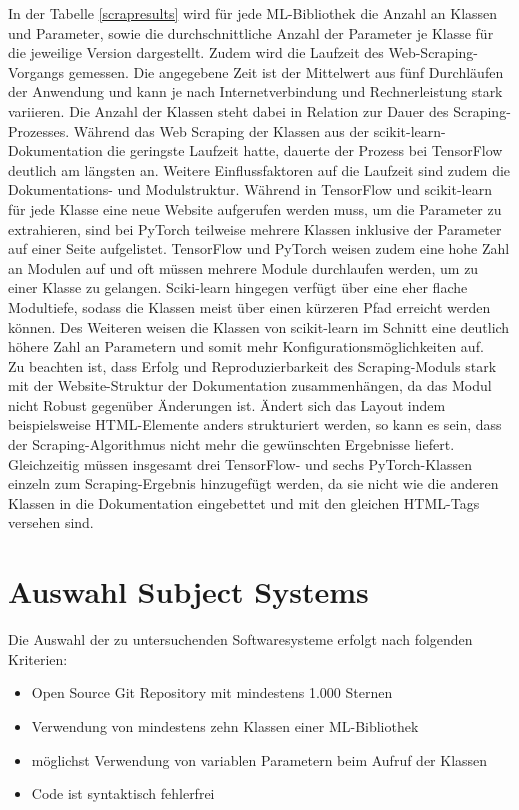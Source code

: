 \documentclass[german,bachelor]{swsLeipzig}
\begin{document}
In der Tabelle \ref{scrapresults} wird für jede ML-Bibliothek die Anzahl an Klassen und Parameter, sowie die durchschnittliche
Anzahl der Parameter je Klasse für die jeweilige Version dargestellt.
Zudem wird die Laufzeit des Web-Scraping-Vorgangs gemessen.
Die angegebene Zeit ist der Mittelwert aus fünf Durchläufen der Anwendung und kann je nach Internetverbindung und Rechnerleistung
stark variieren.
Die Anzahl der Klassen steht dabei in Relation zur Dauer des Scraping-Prozesses.
Während das Web Scraping der Klassen aus der scikit-learn-Dokumentation die geringste Laufzeit hatte,
dauerte der Prozess bei TensorFlow deutlich am längsten an.
Weitere Einflussfaktoren auf die Laufzeit sind zudem die Dokumentations- und Modulstruktur.
Während in TensorFlow und scikit-learn für jede Klasse eine neue Website aufgerufen werden muss, um die Parameter zu extrahieren,
sind bei PyTorch teilweise mehrere Klassen inklusive der Parameter auf einer Seite aufgelistet.
TensorFlow und PyTorch weisen zudem eine hohe Zahl an Modulen auf und oft müssen mehrere Module durchlaufen werden, um zu einer Klasse zu gelangen.
Sciki-learn hingegen verfügt über eine eher flache Modultiefe, sodass die Klassen meist über einen kürzeren Pfad erreicht werden können.
Des Weiteren weisen die Klassen von scikit-learn im Schnitt eine deutlich höhere Zahl an Parametern und somit mehr Konfigurationsmöglichkeiten auf.
\\

Zu beachten ist, dass Erfolg und Reproduzierbarkeit des Scraping-Moduls stark mit der Website-Struktur der Dokumentation zusammenhängen,
da das Modul nicht Robust gegenüber Änderungen ist.
Ändert sich das Layout indem beispielsweise HTML-Elemente anders strukturiert werden, so kann es sein, dass der Scraping-Algorithmus nicht mehr die
gewünschten Ergebnisse liefert.
Gleichzeitig müssen insgesamt drei TensorFlow- und sechs PyTorch-Klassen einzeln zum Scraping-Ergebnis hinzugefügt werden,
da sie nicht wie die anderen Klassen in die Dokumentation eingebettet und mit den gleichen HTML-Tags versehen sind.\\

\section{Auswahl Subject Systems}
Die Auswahl der zu untersuchenden Softwaresysteme erfolgt nach folgenden Kriterien:
\begin{itemize}
 \item Open Source Git Repository mit mindestens 1.000 Sternen
 \item Verwendung von mindestens zehn Klassen einer ML-Bibliothek
 \item möglichst Verwendung von variablen Parametern beim Aufruf der Klassen
 \item Code ist syntaktisch fehlerfrei
\end{itemize}
\end{document}
